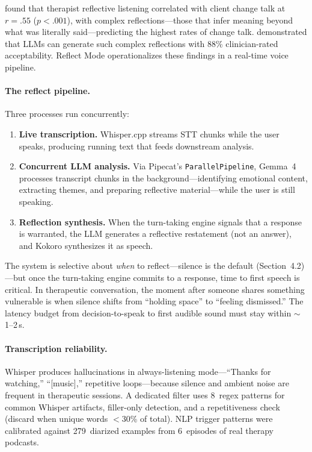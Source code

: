 \documentclass{article}
\begin{document}
\citet{magill2018meta} found that therapist reflective listening correlated with client change talk at $r = .55$ ($p < .001$), with complex reflections---those that infer meaning beyond what was literally said---predicting the highest rates of change talk. \citet{kumar2024gpt4} demonstrated that LLMs can generate such complex reflections with 88\% clinician-rated acceptability. Reflect Mode operationalizes these findings in a real-time voice pipeline.

\paragraph{The reflect pipeline.} Three processes run concurrently:

\begin{enumerate}
\item \textbf{Live transcription.} Whisper.cpp streams STT chunks while the user speaks, producing running text that feeds downstream analysis.
\item \textbf{Concurrent LLM analysis.} Via Pipecat's \texttt{ParallelPipeline}, Gemma~4 processes transcript chunks in the background---identifying emotional content, extracting themes, and preparing reflective material---while the user is still speaking.
\item \textbf{Reflection synthesis.} When the turn-taking engine signals that a response is warranted, the LLM generates a reflective restatement (not an answer), and Kokoro synthesizes it as speech.
\end{enumerate}

The system is selective about \emph{when} to reflect---silence is the default (Section~4.2)---but once the turn-taking engine commits to a response, time to first speech is critical. In therapeutic conversation, the moment after someone shares something vulnerable is when silence shifts from ``holding space'' to ``feeling dismissed.'' The latency budget from decision-to-speak to first audible sound must stay within $\sim$1--2\,s.

\paragraph{Transcription reliability.} Whisper produces hallucinations in always-listening mode---``Thanks for watching,'' ``[music],'' repetitive loops---because silence and ambient noise are frequent in therapeutic sessions. A dedicated filter uses 8~regex patterns for common Whisper artifacts, filler-only detection, and a repetitiveness check (discard when unique words $< 30$\% of total). NLP trigger patterns were calibrated against 279~diarized examples from 6~episodes of real therapy podcasts.
\end{document}
